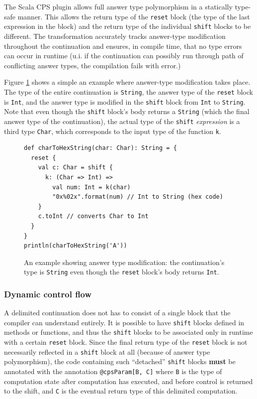 The Scala CPS plugin allows full answer type polymorphism in a statically type-safe manner. This allows the return type of the \texttt{reset} block (the type of the last expression in the block) and the return type of the individual \texttt{shift} blocks to be different. The transformation accurately tracks answer-type modification throughout the continuation and ensures, in compile time, that no type errors can occur in runtime (u.i. if the continuation can possibly run through path of conflicting answer types, the compilation fails with error.)

Figure \ref{fig:example_cps_answer_type_modification} shows a simple an example where answer-type modification takes place. The type of the entire continuation is \texttt{String}, the answer type of the \texttt{reset} block is \texttt{Int}, and the answer type is modified in the \texttt{shift} block from \texttt{Int} to \texttt{String}. Note that even though the \texttt{shift} block's body returns a \texttt{String} (which the final answer type of the continuation), the actual type of the \texttt{shift} \emph{expression} is a third type \texttt{Char}, which corresponds to the input type of the function \texttt{k}.

\begin{figure}[h!] 
\begin{lstlisting}
def charToHexString(char: Char): String = {
  reset {
    val c: Char = shift {
      k: (Char => Int) =>
        val num: Int = k(char)
        "0x%02x".format(num) // Int to String (hex code)
    }
    c.toInt // converts Char to Int
  }
}
println(charToHexString('A'))
\end{lstlisting}
\caption{An example showing answer type modification: the continuation's type is \texttt{String} even though the \texttt{reset} block's body returns \texttt{Int}.}
\label{fig:example_cps_answer_type_modification}
\end{figure}

\subsubsection{Dynamic control flow}

A delimited continuation does not has to consist of a single block that the compiler can understand entirely. It is possible to have \texttt{shift} blocks defined in methods or functions, and thus the \texttt{shift} blocks to be associated only in runtime with a certain \texttt{reset} block. Since the final return type of the \texttt{reset} block is not necessarily reflected in a \texttt{shift} block at all (because of answer type polymorphism), the code containing such ``detached'' \texttt{shift} blocks \textbf{must} be annotated with the annotation \texttt{@cpsParam[B, C]} where \texttt{B} is the type of computation state after computation has executed, and before control is returned to the shift, and \texttt{C} is the eventual return type of this delimited computation. 

